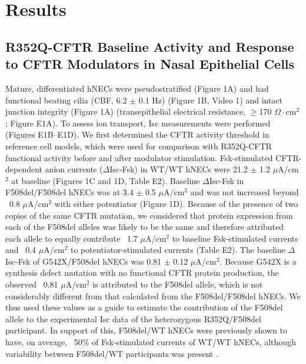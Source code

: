 \section{Results}
\subsection{R352Q-CFTR Baseline Activity and Response to CFTR Modulators in Nasal Epithelial Cells}
Mature, differentiated hNECs were pseudostratified (Figure 1A) and had functional beating cilia (CBF, 6.2 $\pm$ 0.1 Hz) (Figure 1B, Video 1) and intact junction integrity (Figure 1A) (transepithelial electrical resistance, $\geq$170 $\Omega\cdot$cm$^2$; Figure E1A). To assess ion transport, Isc measurements were performed (Figures E1B–E1D). We first determined the CFTR activity threshold in reference cell models, which were used for comparison with R352Q-CFTR functional activity before and after modulator stimulation. Fsk-stimulated CFTR-dependent anion currents ($\Delta$Isc-Fsk) in WT/WT hNECs were 21.2 $\pm$ 1.2 $\mu$A/cm$^2$ at baseline (Figures 1C and 1D, Table E2). Baseline $\Delta$Isc-Fsk in F508del/F508del hNECs was at 3.4 $\pm$ 0.5 $\mu$A/cm$^2$ and was not increased beyond ~0.8 $\mu$A/cm$^2$ with either potentiator (Figure 1D). Because of the presence of two copies of the same CFTR mutation, we considered that protein expression from each of the F508del alleles was likely to be the same and therefore attributed each allele to equally contribute ~1.7 $\mu$A/cm$^2$ to baseline Fsk-stimulated currents and ~0.4 $\mu$A/cm$^2$ to potentiator-stimulated currents (Table E2). The baseline $\Delta$Isc-Fsk of G542X/F508del hNECs was 0.81 $\pm$ 0.12 $\mu$A/cm$^2$. Because G542X is a synthesis defect mutation with no functional CFTR protein production, the observed ~0.81 $\mu$A/cm$^2$ is attributed to the F508del allele, which is not considerably different from that calculated from the F508del/F508del hNECs. We thus used these values as a guide to estimate the contribution of the F508del allele to the experimental Isc data of the heterozygous R352Q/F508del participant. In support of this, F508del/WT hNECs were previously shown to have, on average, ~50\% of Fsk-stimulated currents of WT/WT hNECs, although variability between F508del/WT participants was present \cite{pranke2017}.


